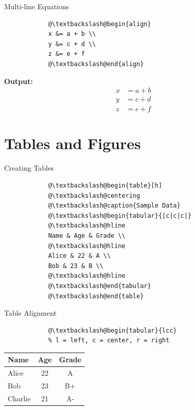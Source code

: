 \documentclass[aspectratio=169]{beamer}
\begin{document}
	\begin{frame}[fragile]{Multi-line Equations}
		\begin{lstlisting}
			@\textbackslash@begin{align}
			x &= a + b \\
			y &= c + d \\
			z &= e + f
			@\textbackslash@end{align}
		\end{lstlisting}
		
		\textbf{Output:}
		\begin{align}
			x &= a + b \\
			y &= c + d \\
			z &= e + f
		\end{align}
	\end{frame}
	
	\section{Tables and Figures}
	
	\begin{frame}[fragile]{Creating Tables}
		\begin{lstlisting}
			@\textbackslash@begin{table}[h]
			@\textbackslash@centering
			@\textbackslash@caption{Sample Data}
			@\textbackslash@begin{tabular}{|c|c|c|}
			@\textbackslash@hline
			Name & Age & Grade \\
			@\textbackslash@hline
			Alice & 22 & A \\
			Bob & 23 & B \\
			@\textbackslash@hline
			@\textbackslash@end{tabular}
			@\textbackslash@end{table}
		\end{lstlisting}
	\end{frame}
	
	\begin{frame}[fragile]{Table Alignment}
		\begin{lstlisting}
			@\textbackslash@begin{tabular}{lcc}
			% l = left, c = center, r = right
		\end{lstlisting}
		
		\vspace{1em}
		
		\begin{table}
			\centering
			\begin{tabular}{lcc}
				\hline
				\textbf{Name} & \textbf{Age} & \textbf{Grade} \\
				\hline
				Alice & 22 & A \\
				Bob & 23 & B+ \\
				Charlie & 21 & A- \\
				\hline
			\end{tabular}
		\end{table}
	\end{frame}
	
\end{document}
